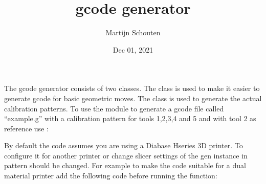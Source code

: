 \documentclass[letterpaper,10pt,english]{sphinxmanual}
\title{gcode generator}
\date{Dec 01, 2021}
\author{Martijn Schouten}
\begin{document}
\pagestyle{empty}
\sphinxmaketitle
\pagestyle{plain}
\sphinxtableofcontents
\pagestyle{normal}
\label{\detokenize{index::doc}}


\sphinxAtStartPar
The gcode generator consists of two classes. The {\hyperref[\detokenize{index:module-0}]{}} class is used to make it easier to generate gcode for basic geometric moves. The {\hyperref[\detokenize{index:module-calibration_pattern}]{}} class is used to generate the actual calibration patterns. To use the module to generate a gcode file called “example.g” with a calibration pattern for tools 1,2,3,4 and 5 and with tool 2 as reference use :

\begin{sphinxVerbatim}[commandchars=\\\{\}]
   

  

  \PYG{p}{[}\PYG{p}{]}
  
  
\end{sphinxVerbatim}

\sphinxAtStartPar
By default the code assumes you are using a Diabase H\sphinxhyphen{}series 3D printer. To configure it for another printer or change slicer settings of the gen instance in pattern should be changed. For example to make the code suitable for a dual material printer add the following code before running the  function:
\end{document}
